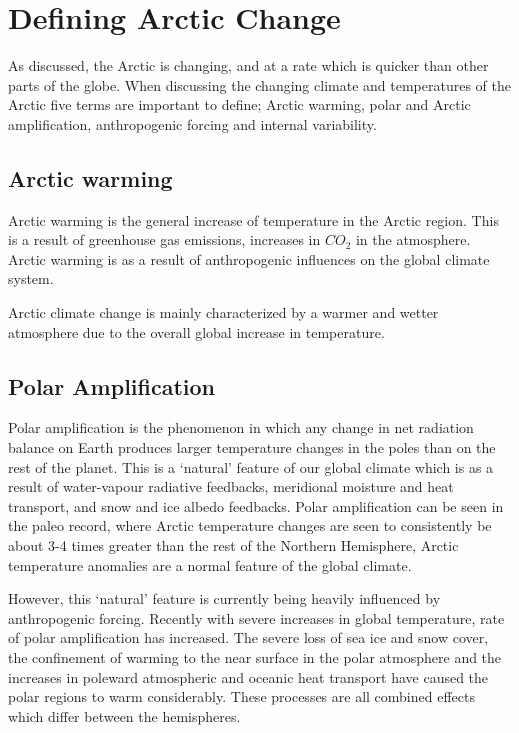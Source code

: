 \documentclass[12pt, oneside]{article}
\begin{document}
\section{Defining Arctic Change}\label{arctic change}
As discussed, the Arctic is changing, and at a rate which is quicker than other parts of the globe. When discussing the changing climate and temperatures of the Arctic five terms are important to define; Arctic warming, polar and Arctic amplification, anthropogenic forcing and internal variability. 



\subsection{Arctic warming}
Arctic warming is the general increase of temperature in the Arctic region. This is a result of greenhouse gas emissions, increases in $CO_2$ in the atmosphere. Arctic warming is as a result of anthropogenic influences on the global climate system. 

Arctic climate change is mainly characterized by a warmer and wetter atmosphere due to the overall global increase in temperature. 

\subsection{Polar Amplification}\label{polar_amplification}
Polar amplification is the phenomenon in which any change in net radiation balance on Earth produces larger temperature changes in the poles than on the rest of the planet. This is a `natural' feature of our global climate which is as a result of water-vapour radiative feedbacks, meridional moisture and heat transport, and snow and ice albedo feedbacks. Polar amplification can be seen in the paleo record\cite{miller2010arctic}, where Arctic temperature changes are seen to consistently be about 3-4 times greater than the rest of the Northern Hemisphere, Arctic temperature anomalies are a normal feature of the global climate.


However, this `natural' feature is currently being heavily influenced by anthropogenic forcing. Recently with severe increases in global temperature, rate of polar amplification has increased. The severe loss of sea ice and snow cover, the confinement of warming to the near surface in the polar atmosphere and the increases in poleward atmospheric and oceanic heat transport have caused the polar regions to warm considerably. These processes are all combined effects which differ between the hemispheres.
\end{document}
